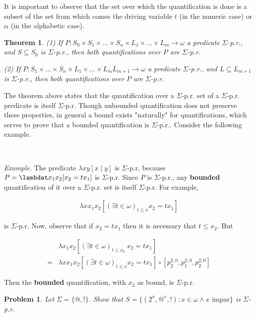 \documentclass[a4paper, 12pt]{article}
\newtheorem{problem}{Problem}
\newtheorem{theorem}{Theorem}
\newtheorem{problem}{Problem}
\newtheorem{theorem}{Theorem}
\begin{document}
It is important to observe that the set over which the quantification is done is
a subset of the set from which comes the driving variable $t$ (in the numeric
case) or $\alpha$ (in the alphabetic case).

\begin{theorem}
    \textit{(1)} If $P: S_0 \times S_1 \times \ldots \times S_n \times L_1 \times
    \ldots \times L_m  \to \omega$ a predicate $\Sigma$-p.r., and $S \subseteq
    S_0$ is $\Sigma$-p.r., then both quantifications over $P$ are $\Sigma$-p.r.


    \textit{(2)} If $P: S_1 \times \ldots \times S_n \times L_1 \times
    \ldots \times L_m  L_{m+1} \to \omega$ a predicate $\Sigma$-p.r., and $L \subseteq
    L_{m+1}$ is $\Sigma$-p.r., then both quantifications over $P$ are $\Sigma$-p.r.
\end{theorem}

   
The theorem above states that the quantification over a $\Sigma$-p.r. set of a
$\Sigma$-p.r. predicate is itself $\Sigma$-p.r. Though unbounded quantification
does not preserve these properties, in general a bound exists "naturally" for
quantifications, which serves to prove that a bounded quantification is
$\Sigma$-p.r.. Consider the following example.

~

\textit{Example.} The predicate $\lambda xy[x \mid y]$ is $\Sigma$-p.r, because
$P = \lambdat x_1 x_2 [x_2 = tx_1]$ is $\Sigma$-p.r. Since $P$ is $\Sigma$-p.r.,
any \textbf{bounded} quantification of it over a $\Sigma$-p.r. set is itself
$\Sigma$-p.r. For example, 

\begin{align*}
    \lambda x x_1 x_2 \left[(\exists t \in \omega)_{t \leq x} x_2 = tx_1\right]
\end{align*}

is $\Sigma$-p.r. Now, observe that if $x_2 = tx_1$ then it is necessary that $t
\leq x_2$. But 

\begin{align*}
    &\lambda x_1 x_2 \left[(\exists t \in \omega)_{t \leq x_2} ~  x_2 =
tx_1\right] \\ = 
    &\lambda x x_1 x_2 \left[(\exists t \in \omega)_{t \leq x} x_2 = tx_1\right]
    \circ \left[ p_{2}^{2, 0}, p_1^{2, 0}, p_2^{2, 0} \right] 
\end{align*}

Then the \textbf{bounded} quantification, with $x_2$ as bound, is $\Sigma$-p.r.


\begin{problem}
    Let $\Sigma = \{@, !\}$. Show that $S = \{(2^x, @^x, !) : x \in \omega \land x \text{ impar}\}$ is $\Sigma$-p.r.
\end{problem}
\end{document}
